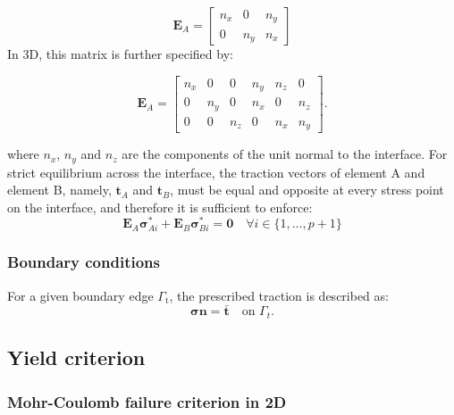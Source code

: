 \begin{equation}
\boldsymbol{E}_A = 
\begin{bmatrix}

n_x & 0 & n_y \\
0 & n_y & n_x
\end{bmatrix} 
\end{equation}
In 3D, this matrix is further specified by:

\begin{equation}
\boldsymbol{E}_A
=
\begin{bmatrix}
n_x & 0 & 0 & n_y & n_z & 0 \\
0 & n_y & 0 & n_x & 0 & n_z \\
0 & 0 & n_z & 0 & n_x & n_y
\end{bmatrix}.
\end{equation}

where $n_x$, $n_y$ and $n_z$ are the components of the unit normal to the interface. For strict equilibrium across the interface, the traction vectors of element A and element B, namely, $\boldsymbol{t}_A$ and $\boldsymbol{t}_B$, must be equal and opposite at every stress point on the interface, and therefore it is sufficient to enforce:
\begin{equation}
\boldsymbol{E}_A\boldsymbol{\sigma}_{Ai}^* + \boldsymbol{E}_B\boldsymbol{\sigma}_{Bi}^* = \boldsymbol{0} \quad \forall i \in \{1, ..., p+1\}
\end{equation}


\subsubsection{Boundary conditions}

For a given boundary edge $\Gamma_{\mathrm{t}}$, the prescribed traction is described as:
\begin{equation}
\boldsymbol{\sigma}\boldsymbol{n} = \bar{\boldsymbol{t}}
\quad \text{on } \Gamma_t .
\label{eq:tractionBC}
\end{equation}




\subsection{Yield criterion}

\subsubsection{Mohr-Coulomb failure criterion in 2D}


